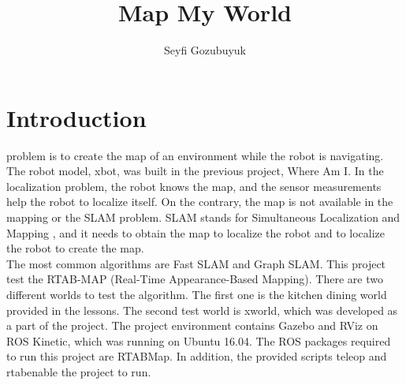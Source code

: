 \documentclass[10pt,journal,compsoc]{IEEEtran}
\begin{document}
\title{Map My World}

\author{Seyfi Gozubuyuk}

%
{}


\maketitle
\IEEEdisplaynontitleabstractindextext
\IEEEpeerreviewmaketitle
\section{Introduction}
\label{sec:introduction}

 problem is to create the map of an environment while the robot is navigating. The robot model, xbot, was built in the previous project, Where Am I\cite{git:whereami}. In the localization problem, the robot knows the map, and the sensor measurements help the robot to localize itself. On the contrary, the map is not available in the mapping or the SLAM problem. SLAM stands for Simultaneous Localization and Mapping \cite{wiki:slam}, and it needs to obtain the map to localize the robot and to localize the robot to create the map.
\\
The most common algorithms are Fast SLAM and Graph SLAM. This project test the RTAB-MAP (Real-Time Appearance-Based Mapping)\cite{rtab}. There are two different worlds to test the algorithm. The first one is the kitchen dining world provided in the lessons. The second test world is xworld, which was developed as a part of the project.
The project environment contains Gazebo and RViz on ROS Kinetic, which was running on Ubuntu 16.04. The ROS packages required to run this project are RTABMap. In addition, the provided scripts teleop and rtab\textunderscore enable the project to run.
\end{document}
